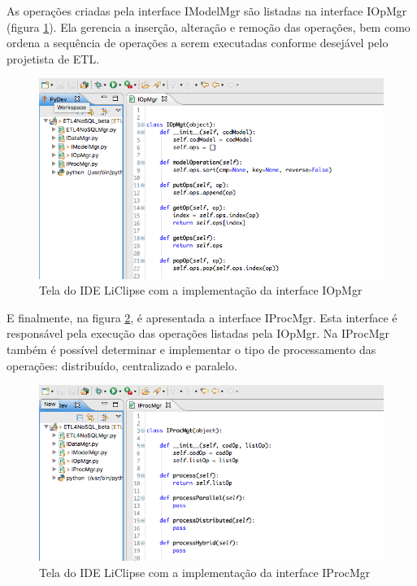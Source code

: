 As operações criadas pela interface IModelMgr são listadas na interface IOpMgr (figura \ref{iopmgr}). Ela gerencia a inserção, alteração e remoção das operações, bem como ordena a sequência de operações a serem executadas conforme desejável pelo projetista de ETL.

\begin{figure}[h!]
	\centering
	\includegraphics[scale=0.6]{fig/iopmgr.png}
	\caption{Tela do IDE LiClipse com a implementação da interface IOpMgr}
	\label{iopmgr}
\end{figure}

E finalmente, na figura \ref{iprocmgr}, é apresentada a interface IProcMgr. Esta interface é responsável pela execução das operações listadas pela IOpMgr. Na IProcMgr também é possível determinar e implementar o tipo de processamento das operações: distribuído, centralizado e paralelo. 

\begin{figure}[h!]
	\centering
	\includegraphics[scale=0.6]{fig/iprocmgr.png}
	\caption{Tela do IDE LiClipse com a implementação da interface IProcMgr}
	\label{iprocmgr}
\end{figure}

